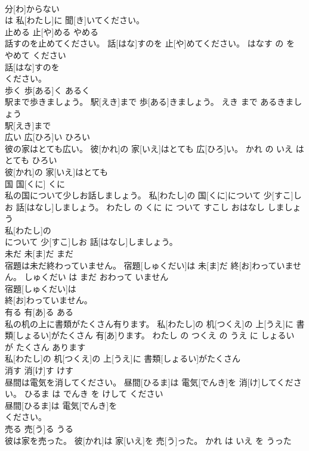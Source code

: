 \documentclass[8pt]{extreport}
\begin{document}
\begin{CJK}{UTF8}{min}
\\	分[わ]からない
\\	は 私[わたし]に 聞[き]いてください。			
\\	止める	止[や]める	やめる	
\\	話すのを止めてください。	話[はな]すのを 止[や]めてください。	はなす の を やめて ください	
\\	話[はな]すのを
\\	ください。			
\\	歩く	歩[ある]く	あるく	
\\	駅まで歩きましょう。	駅[えき]まで 歩[ある]きましょう。	えき まで あるきましょう	
\\	駅[えき]まで
\\	広い	広[ひろ]い	ひろい	
\\	彼の家はとても広い。	彼[かれ]の 家[いえ]はとても 広[ひろ]い。	かれ の いえ は とても ひろい	
\\	彼[かれ]の 家[いえ]はとても
\\	国	国[くに]	くに	
\\	私の国について少しお話しましょう。	私[わたし]の 国[くに]について 少[すこ]しお 話[はなし]しましょう。	わたし の くに に ついて すこし おはなし しましょう	
\\	私[わたし]の
\\	について 少[すこ]しお 話[はなし]しましょう。			
\\	未だ	未[ま]だ	まだ	
\\	宿題は未だ終わっていません。	宿題[しゅくだい]は 未[ま]だ 終[お]わっていません。	しゅくだい は まだ おわって いません	
\\	宿題[しゅくだい]は
\\	終[お]わっていません。			
\\	有る	有[あ]る	ある	
\\	私の机の上に書類がたくさん有ります。	私[わたし]の 机[つくえ]の 上[うえ]に 書類[しょるい]がたくさん 有[あ]ります。	わたし の つくえ の うえ に しょるい が たくさん あります	
\\	私[わたし]の 机[つくえ]の 上[うえ]に 書類[しょるい]がたくさん
\\	消す	消[け]す	けす	
\\	昼間は電気を消してください。	昼間[ひるま]は 電気[でんき]を 消[け]してください。	ひるま は でんき を けして ください	
\\	昼間[ひるま]は 電気[でんき]を
\\	ください。			
\\	売る	売[う]る	うる	
\\	彼は家を売った。	彼[かれ]は 家[いえ]を 売[う]った。	かれ は いえ を うった	

\end{CJK}
\end{document}
